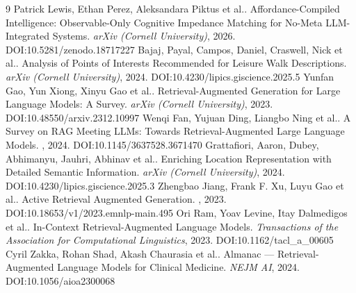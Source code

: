 \documentclass[11pt]{article}
\begin{document}
\begin{thebibliography}{9}
 Patrick Lewis, Ethan Perez, Aleksandara Piktus et al.. Affordance-Compiled Intelligence: Observable-Only Cognitive Impedance Matching for No-Meta LLM-Integrated Systems. \emph{arXiv (Cornell University)}, 2026. DOI:10.5281/zenodo.18717227
 Bajaj, Payal, Campos, Daniel, Craswell, Nick et al.. Analysis of Points of Interests Recommended for Leisure Walk Descriptions. \emph{arXiv (Cornell University)}, 2024. DOI:10.4230/lipics.giscience.2025.5
 Yunfan Gao, Yun Xiong, Xinyu Gao et al.. Retrieval-Augmented Generation for Large Language Models: A Survey. \emph{arXiv (Cornell University)}, 2023. DOI:10.48550/arxiv.2312.10997
 Wenqi Fan, Yujuan Ding, Liangbo Ning et al.. A Survey on RAG Meeting LLMs: Towards Retrieval-Augmented Large Language Models. \emph{}, 2024. DOI:10.1145/3637528.3671470
 Grattafiori, Aaron, Dubey, Abhimanyu, Jauhri, Abhinav et al.. Enriching Location Representation with Detailed Semantic Information. \emph{arXiv (Cornell University)}, 2024. DOI:10.4230/lipics.giscience.2025.3
 Zhengbao Jiang, Frank F. Xu, Luyu Gao et al.. Active Retrieval Augmented Generation. \emph{}, 2023. DOI:10.18653/v1/2023.emnlp-main.495
 Ori Ram, Yoav Levine, Itay Dalmedigos et al.. In-Context Retrieval-Augmented Language Models. \emph{Transactions of the Association for Computational Linguistics}, 2023. DOI:10.1162/tacl\_a\_00605
 Cyril Zakka, Rohan Shad, Akash Chaurasia et al.. Almanac — Retrieval-Augmented Language Models for Clinical Medicine. \emph{NEJM AI}, 2024. DOI:10.1056/aioa2300068
\end{thebibliography}
\end{document}
